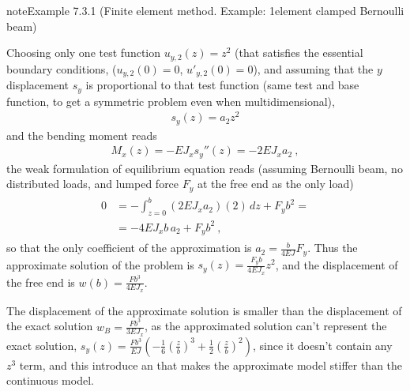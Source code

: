 \documentclass[letterpaper,10pt,english]{jupyterBook}
\begin{document}
\label{ch/solids/small-displacements-statics-beams-weak-form:example-0}
\begin{sphinxadmonition}{note}{Example 7.3.1 (Finite element method. Example: 1\sphinxhyphen{}element clamped Bernoulli beam)}



\sphinxAtStartPar
{} Choosing only one test function \(u_{y,2}(z) = z^2\) (that satisfies the essential boundary conditions, (\(u_{y,2}(0)=0\), \(u'_{y,2}(0)=0\)), and assuming that the \(y\)\sphinxhyphen{}displacement \(s_y\) is proportional to that test function (same test and base function, to get a symmetric problem \sphinxhyphen{} even when multi\sphinxhyphen{}dimensional),
\begin{equation*}
\begin{split}s_y(z) = a_2 z^2\end{split}
\end{equation*}
\sphinxAtStartPar
and the bending moment reads
\begin{equation*}
\begin{split}M_x(z) = - EJ_x s_y''(z) = - 2 EJ_x a_2 \ ,\end{split}
\end{equation*}
\sphinxAtStartPar
the weak formulation of equilibrium equation reads (assuming Bernoulli beam, no distributed loads, and lumped force \(F_y\) at the free end as the only load)
\begin{equation*}
\begin{split}\begin{aligned}
  0 & = - \int_{z=0}^{b} ( 2 EJ_x a_2 ) ( 2 ) \, dz + F_y b^2 = \\
    & = - 4 EJ_x b \, a_2 + F_y b^2 \ ,
\end{aligned}\end{split}
\end{equation*}
\sphinxAtStartPar
so that the only coefficient of the approximation is \(a_2 = \frac{b}{4 EJ} F_y\). Thus the approximate solution of the problem is \(s_y(z) = \frac{F_y b}{4 EJ_x} z^2\), and the displacement of the free end is \(w(b) = \frac{Fb^3}{4 EJ_x}\).

\sphinxAtStartPar
{} The displacement of the approximate solution is smaller than the displacement of the exact solution \(w_B = \frac{Fb^3}{3 EJ_x}\), as the approximated solution can’t represent the exact solution, \(s_y(z) = \frac{Fb^3}{EJ}\left( - \frac{1}{6}\left(\frac{z}{b}\right)^3 + \frac{1}{2}\left(\frac{z}{b}\right)^2 \right)\), since it doesn’t contain any \(z^3\) term, and this introduce an  that makes the approximate model stiffer than the continuous model.


\end{sphinxadmonition}
\end{document}
